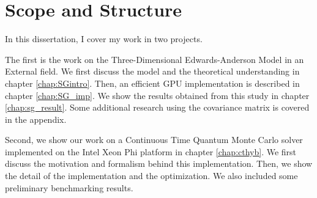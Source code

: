 
\section{Scope and Structure}
In this dissertation, I cover my work in two projects.

The first is the work on the Three-Dimensional Edwards-Anderson Model in an External
field. We first discuss the model and the theoretical understanding in chapter 
\ref{chap:SGintro}. Then, an efficient GPU implementation is described in chapter
\ref{chap:SG_imp}. We show the results obtained from this study in chapter \ref{chap:sg_result}.
Some additional research using the covariance matrix is covered in the appendix.

Second, we show our work on a Continuous Time Quantum Monte Carlo solver implemented
on the Intel Xeon Phi platform in chapter \ref{chap:cthyb}. We first discuss the 
motivation and formalism behind this implementation. Then, we show the detail of
the implementation and the optimization. We also included some preliminary benchmarking
results.



